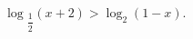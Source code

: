 \begin{ex}[type=inequality]
	\begin{condition}
		$ \log$\tiny$_{\dfrac{1}{2}}$\normalsize$(x + 2)>\log_2(1 - x).$
	\end{condition}
\end{ex}